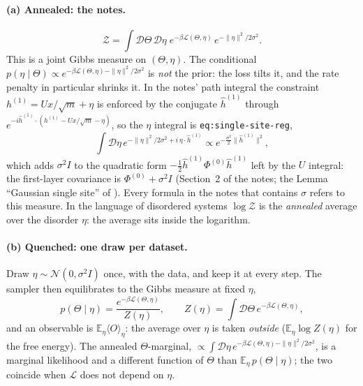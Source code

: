 \documentclass[11pt,a4paper]{article}
\newcommand{\E}{\mathbb E}
\newcommand{\D}{\mathcal D}
\newcommand{\Lc}{\mathcal L}
\newcommand{\Z}{\mathcal Z}
\theoremstyle{remark}
\begin{document}
\paragraph{(a) Annealed: the notes.}
\begin{equation}
  \Z = \int\D\Theta\,\D\eta\;
  e^{-\beta\Lc(\Theta,\eta)}\,e^{-\|\eta\|^2/2\sigma^2} .
  \label{eq:annealed}
\end{equation}
This is a joint Gibbs measure on $(\Theta,\eta)$. The conditional
$p(\eta\mid\Theta)\propto e^{-\beta\Lc(\Theta,\eta)-\|\eta\|^2/2\sigma^2}$ is
\emph{not} the prior: the loss tilts it, and the rate penalty in particular
shrinks it. In the notes' path integral the constraint
$h^{(1)} = Ux/\sqrt m + \eta$ is enforced by the conjugate $\hat h^{(1)}$
through $e^{-i\hat h^{(1)}\cdot(h^{(1)} - Ux/\sqrt m - \eta)}$, so the
$\eta$ integral is \texttt{eq:single-site-reg},
\begin{equation}
  \int\D\eta\,e^{-\|\eta\|^2/2\sigma^2 + i\,\eta\cdot\hat h^{(1)}}
  \propto e^{-\frac{\sigma^2}{2}\|\hat h^{(1)}\|^2},
\end{equation}
which adds $\sigma^2 I$ to the quadratic form $-\frac12\hat h^{(1)}\Phi^{(0)}\hat h^{(1)}$
left by the $U$ integral: the first-layer covariance is $\Phi^{(0)} + \sigma^2 I$
(Section~2 of the notes; the Lemma ``Gaussian single site'' of
). Every
formula in the notes that contains $\sigma$ refers to this measure. In the
language of disordered systems $\log\Z$ is the \emph{annealed} average over
the disorder $\eta$: the average sits inside the logarithm.

\paragraph{(b) Quenched: one draw per dataset.}
Draw $\eta\sim\mathcal N(0,\sigma^2 I)$ once, with the data, and keep it at
every step. The sampler then equilibrates to the Gibbs measure at fixed $\eta$,
\begin{equation}
  p(\Theta\mid\eta) = \frac{e^{-\beta\Lc(\Theta,\eta)}}{Z(\eta)},\qquad
  Z(\eta) = \int\D\Theta\,e^{-\beta\Lc(\Theta,\eta)},
  \label{eq:quenched}
\end{equation}
and an observable is $\E_\eta\langle O\rangle_\eta$: the average over $\eta$
is taken \emph{outside} ($\E_\eta\log Z(\eta)$ for the free energy). The
annealed $\Theta$-marginal, $\propto\int\D\eta\,e^{-\beta\Lc(\Theta,\eta)-\|\eta\|^2/2\sigma^2}$,
is a marginal likelihood and a different function of $\Theta$ than
$\E_\eta\,p(\Theta\mid\eta)$; the two coincide when $\Lc$ does not depend
on $\eta$.
\end{document}
